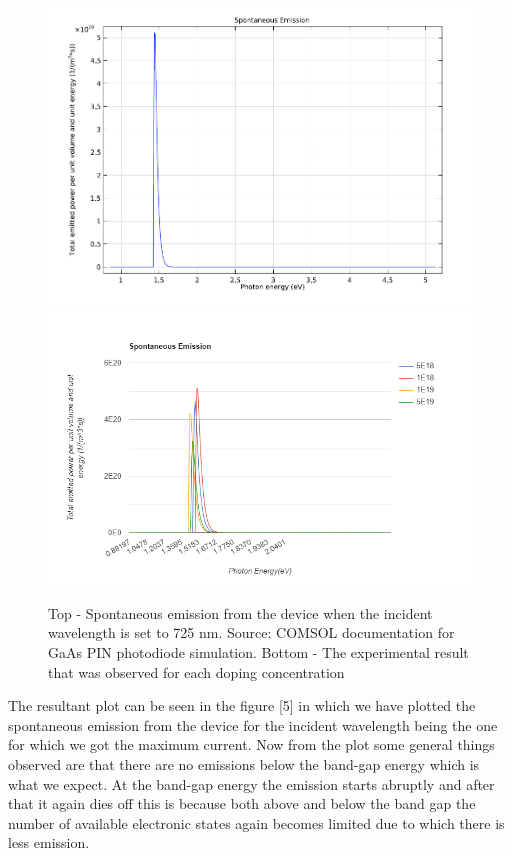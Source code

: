 \documentclass[conference]{IEEEtran}
\begin{document}
\begin{figure}
\begin{center}
\includegraphics[scale = 0.3]{Spont.png}
\includegraphics[scale = 0.4]{spont emission.png}
\caption{Top - Spontaneous emission from the device when the incident wavelength is set to 725 nm. Source: COMSOL documentation for GaAs PIN photodiode simulation. Bottom - The experimental result that was observed for each doping concentration}
\end{center}
\end{figure}

The resultant plot can be seen in the figure [5] in which we have plotted the spontaneous emission from the device for the incident wavelength being the one for which we got the maximum current. Now from the plot some general things observed are that there are no emissions below the band-gap energy which is what we expect. At the band-gap energy the emission starts abruptly and after that it again dies off this is because both above and below the band gap the number of available electronic states again becomes limited due to which there is less emission.\\
\end{document}

